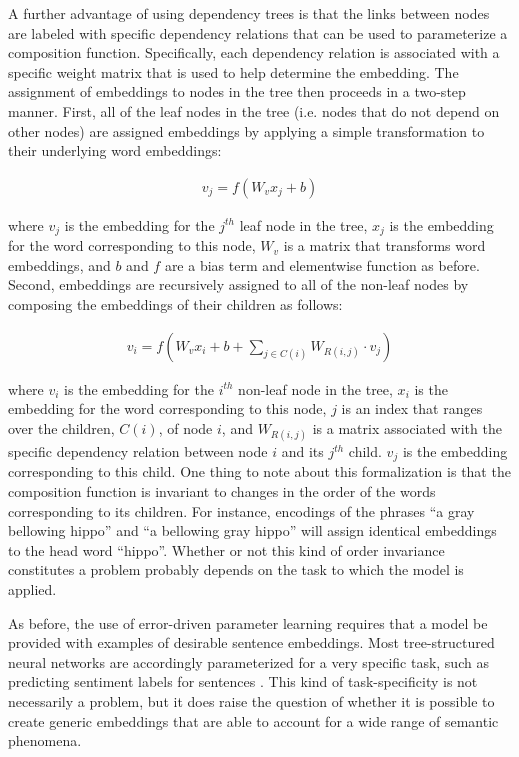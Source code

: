 A further advantage of using dependency trees is that the links between nodes are labeled with specific dependency relations that can be used to parameterize a composition function. Specifically, each dependency relation is associated with a specific weight matrix that is used to help determine the embedding. The assignment of embeddings to nodes in the tree then proceeds in a two-step manner. First, all of the leaf nodes in the tree (i.e. nodes that do not depend on other nodes) are assigned embeddings by applying a simple transformation to their underlying word embeddings:

\begin{align} 
\label{eqn:dt_rnn_leaf}
v_j = f (W_v x_j + b) 
\end{align}

\noindent
where $v_j$ is the embedding for the $j^{th}$ leaf node in the tree, $x_j$ is the embedding for the word corresponding to this node, $W_v$ is a matrix that transforms word embeddings, and $b$ and $f$ are a bias term and elementwise function as before. Second, embeddings are recursively assigned to all of the non-leaf nodes by composing the embeddings of their children as follows:

\begin{align}
\label{eqn:dt_rnn_nonleaf}
v_i = f (W_v x_i + b + \sum_{j \in C(i)} W_{R(i,j)} \cdot v_j )
\end{align}

\noindent
where $v_i$ is the embedding for the $i^{th}$ non-leaf node in the tree, $x_i$ is the embedding for the word corresponding to this node, $j$ is an index that ranges over the children, $C(i)$, of node $i$, and $W_{R(i, j)}$ is a matrix associated with the specific dependency relation between node $i$ and its $j^{th}$ child. $v_j$ is the embedding corresponding to this child. One thing to note about this formalization is that the composition function is invariant to changes in the order of the words corresponding to its children. For instance, encodings of the phrases ``a gray bellowing hippo'' and ``a bellowing gray hippo'' will assign identical embeddings to the head word ``hippo''. Whether or not this kind of order invariance constitutes a problem probably depends on the task to which the model is applied.

As before, the use of error-driven parameter learning requires that a model be provided with examples of desirable sentence embeddings. Most tree-structured neural networks are accordingly parameterized for a very specific task, such as predicting sentiment labels for sentences \citep{Socher:2011,Socher:2012}. This kind of task-specificity is not necessarily a problem, but it does raise the question of whether it is possible to create generic embeddings that are able to account for a wide range of semantic phenomena.

